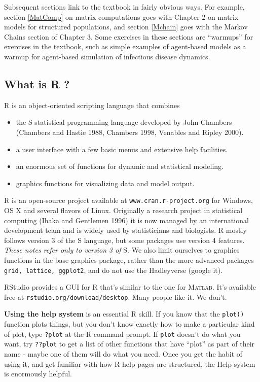 \documentclass [11pt]{article}
\newcounter{exercise}
\numberwithin{exercise}{section}
\def\R{R }
\begin{document}
Subsequent sections link to the textbook in fairly obvious ways. For example,
section \ref{MatComp} on matrix computations goes with Chapter 2 on matrix models for
structured populations, and section \ref{Mchain} goes with the Markov Chains section of Chapter 3. 
Some exercises in these sections are ``warmups'' for
exercises in the textbook, such as simple examples of agent-based 
models as a warmup for agent-based simulation of infectious disease dynamics. 

\subsection*{What is \R?}
\R is an object-oriented scripting language that combines 
\begin{itemize}
\item the \textsf{S} statistical programming language developed by John Chambers (Chambers and
Hastie 1988, Chambers 1998, Venables and Ripley 2000).
\item a user interface with a few basic menus and extensive help facilities.
\item an enormous set of functions for dynamic and statistical modeling.  
\item graphics functions for visualizing data and model output.
\end{itemize}
\R is an open-source project available at \texttt{www.cran.r-project.org}
for Windows, OS X and several flavors of Linux. Originally a research project in statistical computing (Ihaka and
Gentlemen 1996) it is now managed by an international development team and is widely used by statisticians 
and biologists. \R mostly follows version 3 of the \textsf{S} language, but some packages use version 4 features. 
\textit{These notes refer only to version 3 of} \textsf{S}. We also limit ourselves to
graphics functions in the base graphics package, rather than the more 
advanced packages \texttt{grid, lattice, ggplot2}, and do not use the Hadleyverse (google it).    

RStudio provides a GUI for \R that's similar to the one for \textsc{Matlab}. 
It's available free at \texttt{rstudio.org/download/desktop}. Many people like it. We don't.  

\textbf{Using the help system} is an essential \R skill. If you know that the \texttt{plot()}
function plots things, but you don't know exactly how to make a particular kind of plot,
type \texttt{?plot} at the R command prompt. If \texttt{plot}
doesn't do what you want, try \texttt{??plot} to get a list of other
functions that have ``plot'' as part of their name - maybe one of them will do what you need. 
Once you get the habit of using it, and get familiar with how \R help
pages are structured, the Help system is enormously helpful.  
\end{document}
